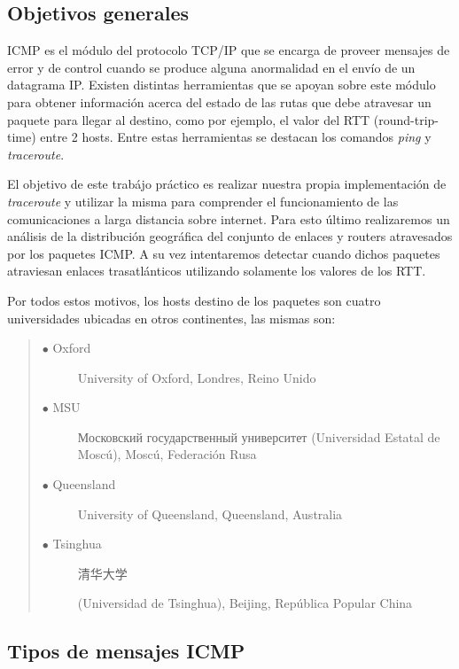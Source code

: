 \subsection{Objetivos generales}

ICMP es el m\'odulo del protocolo TCP/IP que se encarga de proveer mensajes de error y de control cuando
se produce alguna anormalidad en el env\'io de un datagrama IP. Existen distintas herramientas
que se apoyan sobre este m\'odulo para obtener informaci\'on acerca del estado de las rutas que
debe atravesar un paquete para llegar al destino, como por ejemplo, el valor del RTT (round-trip-time)
entre 2 hosts. Entre estas herramientas se destacan los comandos \emph{ping} y \emph{traceroute}.

El objetivo de este trab\'ajo pr\'actico es realizar nuestra propia
implementaci\'on de \emph{traceroute} y utilizar la misma para comprender el
funcionamiento de las comunicaciones a larga distancia sobre internet.
Para esto \'ultimo realizaremos un an\'alisis de la distribuci\'on
geogr\'afica del conjunto de enlaces y routers atravesados por los paquetes
ICMP.
A su vez intentaremos detectar cuando dichos paquetes atraviesan enlaces
trasatl\'anticos utilizando solamente los valores de los RTT.

Por todos estos motivos, los hosts destino de los paquetes son cuatro universidades ubicadas en
otros continentes, las mismas son:

\begin{quote}
\begin{description}
	\item [$\bullet$ Oxford] {University of Oxford, Londres, Reino Unido}
	\item [$\bullet$ MSU] {\foreignlanguage{russian}{Московский государственный университет} (Universidad Estatal de Mosc\'u), Mosc\'u, Federaci\'on Rusa}
	\item [$\bullet$ Queensland] {University of Queensland, Queensland, Australia}
	\item [$\bullet$ Tsinghua] {\begin{CJK}{UTF8}{gbsn}清华大学\end{CJK} (Universidad de Tsinghua), Beijing, Rep\'ublica Popular China}
\end{description}
\end{quote}

\subsection{Tipos de mensajes ICMP}

